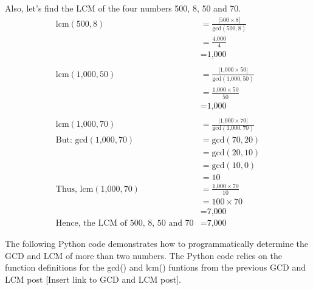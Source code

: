\documentclass[
]{book}
\begin{document}
Also, let's find the LCM of the four numbers 500, 8, 50 and 70.
\[
\begin{aligned}
\text{lcm}(500, 8) &= \frac{|500 \times 8|}{\text{gcd}(500, 8)} \\
 &= \frac{\text{4,000}}{4} \\
 &= \text{1,000} \\
 \\
\text{lcm}(\text{1,000}, 50) &= \frac{|\text{1,000} \times 50|}{\text{gcd}(\text{1,000}, 50)} \\
 &= \frac{\text{1,000} \times 50}{50} \\
 &= \text{1,000} \\
 \\
\text{lcm}(\text{1,000}, 70) &= \frac{|\text{1,000} \times 70|}{\text{gcd}(\text{1,000}, 70)} \\
\text{But: gcd}(\text{1,000}, 70) &= \text{gcd}(70, 20) \\
 &= \text{gcd}(20, 10) \\
 &= \text{gcd}(10, 0) \\
 &= 10 \\
\text{Thus, lcm}(\text{1,000}, 70) &= \frac{\text{1,000} \times 70}{10} \\
 &= 100 \times 70 \\
 &= \text{7,000} \\
\text{Hence, the LCM of 500, 8, 50 and 70} &= \text{7,000}
\end{aligned}
\]

The following Python code demonstrates how to programmatically determine the GCD and LCM of more than two numbers. The Python code relies on the function definitions for the gcd() and lcm() funtions from the previous GCD and LCM post {[}Insert link to GCD and LCM post{]}.
\end{document}
